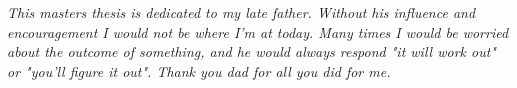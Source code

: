 \chapter*{}
\begin{center}
{\centering \it This masters thesis is dedicated to my late father. Without his influence and encouragement I would not be where I'm at today. Many times I would be worried about the outcome of something, and he would always respond "it will work out" or "you'll figure it out". Thank you dad for all you did for me.}
\end{center} 